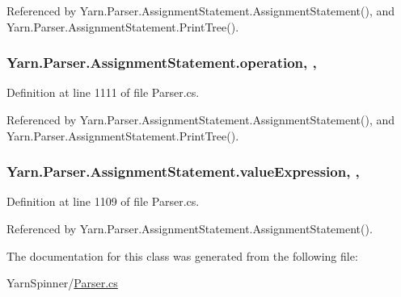 Referenced by Yarn.\-Parser.\-Assignment\-Statement.\-Assignment\-Statement(), and Yarn.\-Parser.\-Assignment\-Statement.\-Print\-Tree().

\hypertarget{a00041_a896df0f23b44e9f20036150b3527d9e5}{
\subsubsection[{operation}]{ Yarn.\-Parser.\-Assignment\-Statement.\-operation\hspace{0.3cm}{\ttfamily [get]}, {\ttfamily [set]}, {\ttfamily [package]}}}\label{a00041_a896df0f23b44e9f20036150b3527d9e5}


Definition at line 1111 of file Parser.\-cs.



Referenced by Yarn.\-Parser.\-Assignment\-Statement.\-Assignment\-Statement(), and Yarn.\-Parser.\-Assignment\-Statement.\-Print\-Tree().

\hypertarget{a00041_a7ada366012cacd98436db80227ee65f5}{
\subsubsection[{value\-Expression}]{ Yarn.\-Parser.\-Assignment\-Statement.\-value\-Expression\hspace{0.3cm}{\ttfamily [get]}, {\ttfamily [set]}, {\ttfamily [package]}}}\label{a00041_a7ada366012cacd98436db80227ee65f5}


Definition at line 1109 of file Parser.\-cs.



Referenced by Yarn.\-Parser.\-Assignment\-Statement.\-Assignment\-Statement().



The documentation for this class was generated from the following file\-:\begin{DoxyCompactItemize}
\item 
Yarn\-Spinner/\hyperlink{a00316}{Parser.\-cs}\end{DoxyCompactItemize}
